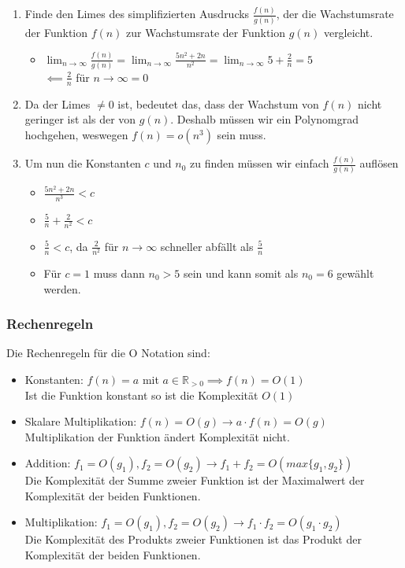 \documentclass[
../../AuD-Zusammenfassung.tex,
]
{subfiles}
\begin{document}
\begin{enumerate}
    \item Finde den Limes des simplifizierten Ausdrucks $\frac{f(n)}{g(n)}$, der die Wachstumsrate der Funktion $f(n)$ zur Wachstumsrate der Funktion $g(n)$ vergleicht.
    \begin{itemize}
        \item $\lim_{n \to \infty} \frac{f(n)}{g(n)} = \lim_{n \to \infty} \frac{5n^2 + 2n}{n^2} = \lim_{n \to \infty} 5 + \frac{2}{n} = 5$\\
        $\impliedby \frac{2}{n}$ für $n \to \infty = 0$ 
    \end{itemize}
    \item Da der Limes $\not= 0$ ist, bedeutet das, dass der Wachstum von $f(n)$ nicht geringer ist als der von $g(n)$. Deshalb müssen wir ein Polynomgrad hochgehen, weswegen $f(n) = o(n^3)$ sein muss. 
    \item Um nun die Konstanten $c$ und $n_0$ zu finden müssen wir einfach $\frac{f(n)}{g(n)}$ auflösen
    \begin{itemize}
        \item $\frac{5n^2 + 2n}{n^3} < c$
        \item $\frac{5}{n} + \frac{2}{n^2} < c$
        \item $\frac{5}{n} < c$, da $\frac{2}{n^2}$ für $n \to \infty$ schneller abfällt als $\frac{5}{n}$
        \item Für $c = 1$ muss dann $n_0 > 5$ sein und kann somit als $n_0 = 6$ gewählt werden.
    \end{itemize}
\end{enumerate}

\subsubsection{Rechenregeln}
Die Rechenregeln für die O Notation sind:
\begin{itemize}
    \item Konstanten: $f(n) = a$ mit $a \in \mathbb{R}_{>0} \implies f(n) = O(1)$\\
    Ist die Funktion konstant so ist die Komplexität $O(1)$
    \item Skalare Multiplikation: $f(n) = O(g) \longrightarrow a \cdot f(n) = O(g)$\\ 
    Multiplikation der Funktion ändert Komplexität nicht.
    \item Addition: $f_1 = O(g_1), f_2 = O(g_2) \longrightarrow f_1 + f_2 = O(max\{g_1, g_2\})$\\
    Die Komplexität der Summe zweier Funktion ist der Maximalwert der Komplexität der beiden Funktionen.
    \item Multiplikation: $f_1 = O(g_1), f_2 = O(g_2) \longrightarrow   f_1 \cdot f_2 = O(g_1 \cdot g_2)$\\
    Die Komplexität des Produkts zweier Funktionen ist das Produkt der Komplexität der beiden Funktionen.
\end{itemize}
\end{document}
